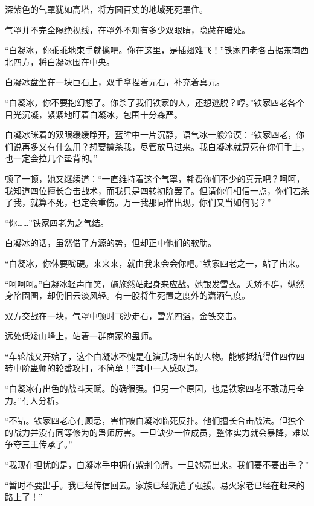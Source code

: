 
\begin{this_body}



深紫色的气罩犹如高塔，将方圆百丈的地域死死罩住。

气罩并不完全隔绝视线，在罩外不知有多少双眼睛，隐藏在暗处。

“白凝冰，你乖乖地束手就擒吧。你在这里，是插翅难飞！”铁家四老各占据东南西北四方，将白凝冰围在中央。

白凝冰盘坐在一块巨石上，双手拿捏着元石，补充着真元。

“白凝冰，你不要抱幻想了。你杀了我们铁家的人，还想逃脱？哼。”铁家四老各个目光沉凝，紧紧地盯着白凝冰，包围十分森严。

白凝冰眯着的双眼缓缓睁开，蓝眸中一片沉静，语气冰一般冷漠：“铁家四老，你们说再多又有什么用？想要擒杀我，尽管放马过来。我白凝冰就算死在你们手上，也一定会拉几个垫背的。”

顿了一顿，她又继续道：“一直维持着这个气罩，耗费你们不少的真元吧？呵呵，我知道四位擅长合击战术，而我只是四转初阶罢了。但请你们相信一点，你们若杀了我，就算不死，也定会重伤。万一我那同伴出现，你们又当如何呢？”

“你……”铁家四老为之气结。

白凝冰的话，虽然借了方源的势，但却正中他们的软肋。

“白凝冰，你休要嘴硬。来来来，就由我来会会你吧。”铁家四老之一，站了出来。

“呵呵呵。”白凝冰轻声而笑，施施然站起身来应战。她银发雪衣。夭矫不群，纵然身陷囹圄，却仍旧云淡风轻。有一股将生死置之度外的潇洒气度。

双方交战在一块，气罩中顿时飞沙走石，雪光四溢，金铁交击。

远处低矮山峰上，站着一群商家的蛊师。

“车轮战又开始了，这个白凝冰不愧是在演武场出名的人物。能够抵抗得住四位四转中阶蛊师的轮番攻打，不简单！”其中一人感叹道。

“白凝冰有出色的战斗天赋。的确很强。但另一个原因，也是铁家四老不敢动用全力。”有人分析。

“不错。铁家四老心有顾忌，害怕被白凝冰临死反扑。他们擅长合击战法。但独个的战力并没有同等修为的蛊师厉害。一旦缺少一位成员，整体实力就会暴降，难以争夺三王传承了。”

“我现在担忧的是，白凝冰手中拥有紫荆令牌。一旦她亮出来。我们要不要出手？”

“暂时不要出手。我已经传信回去。家族已经派遣了强援。易火家老已经在赶来的路上了！”


\end{this_body}

